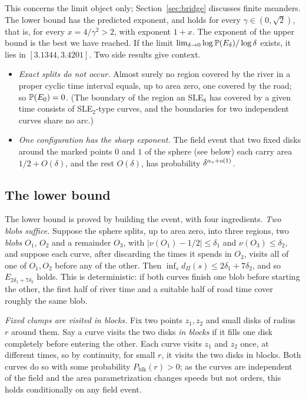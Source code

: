 This concerns the limit object only; Section~\ref{sec:bridge} discusses finite meanders. The lower
bound has the predicted exponent, and holds for every
$\gamma\in(0,\sqrt2)$, that is, for every $x=4/\gamma^2>2$, with exponent $1+x$. The exponent of the upper bound is the best we
have reached. If the limit $\lim_{\delta\to0}\log\mathbb{P}(E_\delta)/\log\delta$ exists, it lies in
$[3.1344,3.4201]$. Two side results give context.
\begin{itemize}
\item \emph{Exact splits do not occur.} Almost surely no region covered by the river in a proper
cyclic time interval equals, up to area zero, one covered by the road; so $\mathbb{P}(E_0)=0$. (The
boundary of the region an SLE$_8$ has covered by a given time consists of SLE$_2$-type curves, and
the boundaries for two independent curves share no arc.)
\item \emph{One configuration has the sharp exponent.} The field event that two fixed disks around
the marked points $0$ and $1$ of the sphere (see below) each carry area $1/2+O(\delta)$, and the rest
$O(\delta)$, has probability $\delta^{\alpha_*+o(1)}$.
\end{itemize}

\subsection{The lower bound}

The lower bound is proved by building the event, with four ingredients.
\emph{Two blobs suffice.} Suppose the sphere splits, up to area zero, into three regions, two
\emph{blobs} $O_1$, $O_2$ and a remainder $O_3$, with $|\nu(O_1)-1/2|\le\delta_1$ and $\nu(O_3)\le\delta_2$, and suppose each curve, after
discarding the times it spends in $O_3$, visits all of one of $O_1,O_2$ before any of the other.
Then $\inf_sd_\Pi(s)\le2\delta_1+7\delta_2$, and so $E_{2\delta_1+7\delta_2}$ holds. This is deterministic:
if both curves finish one blob before starting the other, the first half of river time and a
suitable half of road time cover roughly the same blob.

\emph{Fixed clumps are visited in blocks.} Fix two points $z_1,z_2$ and small disks of radius $r$
around them. Say a curve visits the two disks \emph{in blocks} if it fills one disk completely
before entering the other. Each curve visits $z_1$ and $z_2$ once, at different times, so by
continuity, for small $r$, it visits the two disks in blocks. Both curves do so with some probability $P_{\mathrm{blk}}(r)>0$; as the curves
are independent of the field and the area parametrization changes speeds but not orders, this holds
conditionally on any field event.

